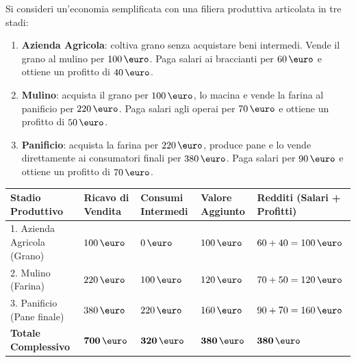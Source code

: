 \begin{esempio}
Si consideri un'economia semplificata con una filiera produttiva articolata in tre stadi:
\begin{enumerate}
    \item \textbf{Azienda Agricola}: coltiva grano senza acquistare beni intermedi. Vende il grano al mulino per $100\,\text{\euro}$. Paga salari ai braccianti per $60\,\text{\euro}$ e ottiene un profitto di $40\,\text{\euro}$.
    \item \textbf{Mulino}: acquista il grano per $100\,\text{\euro}$, lo macina e vende la farina al panificio per $220\,\text{\euro}$. Paga salari agli operai per $70\,\text{\euro}$ e ottiene un profitto di $50\,\text{\euro}$.
    \item \textbf{Panificio}: acquista la farina per $220\,\text{\euro}$, produce pane e lo vende direttamente ai consumatori finali per $380\,\text{\euro}$. Paga salari per $90\,\text{\euro}$ e ottiene un profitto di $70\,\text{\euro}$.
\end{enumerate}

\begin{center}
\small
\renewcommand{\arraystretch}{1.3}
\begin{tabularx}{\linewidth}{l X X X X}
\toprule
\textbf{Stadio Produttivo} & \textbf{Ricavo di Vendita} & \textbf{Consumi Intermedi} & \textbf{Valore Aggiunto} & \textbf{Redditi (Salari + Profitti)} \\
\midrule
1. Azienda Agricola (Grano) & $100\,\text{\euro}$ & $0\,\text{\euro}$ & $100\,\text{\euro}$ & $60 + 40 = 100\,\text{\euro}$ \\
2. Mulino (Farina)          & $220\,\text{\euro}$ & $100\,\text{\euro}$ & $120\,\text{\euro}$ & $70 + 50 = 120\,\text{\euro}$ \\
3. Panificio (Pane finale)  & $380\,\text{\euro}$ & $220\,\text{\euro}$ & $160\,\text{\euro}$ & $90 + 70 = 160\,\text{\euro}$ \\
\midrule
\textbf{Totale Complessivo} & $\mathbf{700\,\text{\euro}}$ & $\mathbf{320\,\text{\euro}}$ & $\mathbf{380\,\text{\euro}}$ & $\mathbf{380\,\text{\euro}}$ \\
\bottomrule
\end{tabularx}
\end{center}


\end{esempio}
